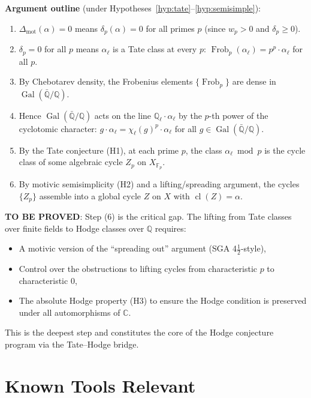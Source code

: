 \documentclass[11pt]{article}
\theoremstyle{definition}
\DeclareMathOperator{\Gal}{Gal}
\DeclareMathOperator{\Frob}{Frob}
\DeclareMathOperator{\cl}{cl}
\begin{document}
\textbf{Argument outline} (under Hypotheses~\ref{hyp:tate}--\ref{hyp:semisimple}):
\begin{enumerate}
  \item $\Delta_{\mathrm{mot}}(\alpha) = 0$ means $\delta_p(\alpha) = 0$ for all primes $p$
    (since $w_p > 0$ and $\delta_p \geq 0$).
  \item $\delta_p = 0$ for all $p$ means $\alpha_\ell$ is a Tate class at every $p$:
    $\Frob_p(\alpha_\ell) = p^p \cdot \alpha_\ell$ for all $p$.
  \item By Chebotarev density, the Frobenius elements $\{\Frob_p\}$ are dense in $\Gal(\bar{\mathbb{Q}}/\mathbb{Q})$.
  \item Hence $\Gal(\bar{\mathbb{Q}}/\mathbb{Q})$ acts on the line $\mathbb{Q}_\ell \cdot \alpha_\ell$
    by the $p$-th power of the cyclotomic character: $g \cdot \alpha_\ell = \chi_\ell(g)^p \cdot \alpha_\ell$
    for all $g \in \Gal(\bar{\mathbb{Q}}/\mathbb{Q})$.
  \item By the Tate conjecture (H1), at each prime $p$, the class $\alpha_\ell \bmod p$
    is the cycle class of some algebraic cycle $Z_p$ on $X_{\mathbb{F}_p}$.
  \item By motivic semisimplicity (H2) and a lifting/spreading argument,
    the cycles $\{Z_p\}$ assemble into a global cycle $Z$ on $X$
    with $\cl(Z) = \alpha$.
\end{enumerate}

\textbf{TO BE PROVED}: Step (6) is the critical gap.
The lifting from Tate classes over finite fields to Hodge classes over $\mathbb{Q}$
requires:
\begin{itemize}
  \item A motivic version of the ``spreading out'' argument (SGA 4$\frac{1}{2}$-style),
  \item Control over the obstructions to lifting cycles from characteristic $p$ to characteristic 0,
  \item The absolute Hodge property (H3) to ensure the Hodge condition is preserved
    under all automorphisms of $\mathbb{C}$.
\end{itemize}

This is the deepest step and constitutes the core of the Hodge conjecture program
via the Tate--Hodge bridge.

\section{Known Tools Relevant}
\end{document}
